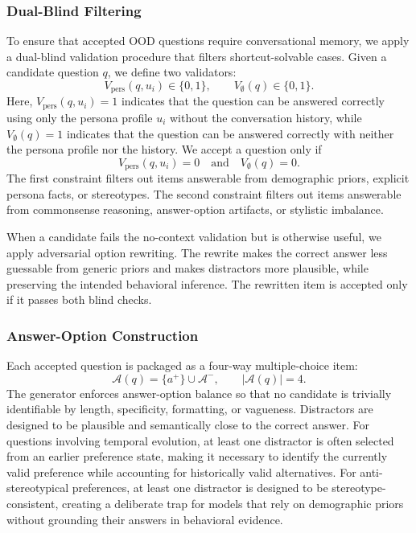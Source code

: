 \documentclass{llmxive}
\begin{document}
\subsubsection{Dual-Blind Filtering}
\label{app:persona_dual_blind_filtering}
To ensure that accepted OOD questions require conversational memory, we apply a dual-blind validation procedure that filters shortcut-solvable cases. Given a candidate question $q$, we define two validators:
\[
V_{\mathrm{pers}}(q,u_i) \in \{0,1\},
\qquad
V_{\emptyset}(q) \in \{0,1\}.
\]
Here, $V_{\mathrm{pers}}(q,u_i)=1$ indicates that the question can be answered correctly using only the persona profile $u_i$ without the conversation history, while $V_{\emptyset}(q)=1$ indicates that the question can be answered correctly with neither the persona profile nor the history. We accept a question only if
\[
V_{\mathrm{pers}}(q,u_i)=0
\quad \text{and} \quad
V_{\emptyset}(q)=0.
\]
The first constraint filters out items answerable from demographic priors, explicit persona facts, or stereotypes. The second constraint filters out items answerable from commonsense reasoning, answer-option artifacts, or stylistic imbalance.

When a candidate fails the no-context validation but is otherwise useful, we apply adversarial option rewriting. The rewrite makes the correct answer less guessable from generic priors and makes distractors more plausible, while preserving the intended behavioral inference. The rewritten item is accepted only if it passes both blind checks.

\subsubsection{Answer-Option Construction}
\label{app:persona_answer_options}
Each accepted question is packaged as a four-way multiple-choice item:
\[
\mathcal{A}(q)=\{a^{+}\}\cup\mathcal{A}^{-},
\qquad
|\mathcal{A}(q)|=4.
\]
The generator enforces answer-option balance so that no candidate is trivially identifiable by length, specificity, formatting, or vagueness. Distractors are designed to be plausible and semantically close to the correct answer. For questions involving temporal evolution, at least one distractor is often selected from an earlier preference state, making it necessary to identify the currently valid preference while accounting for historically valid alternatives. For anti-stereotypical preferences, at least one distractor is designed to be stereotype-consistent, creating a deliberate trap for models that rely on demographic priors without grounding their answers in behavioral evidence.
\end{document}

